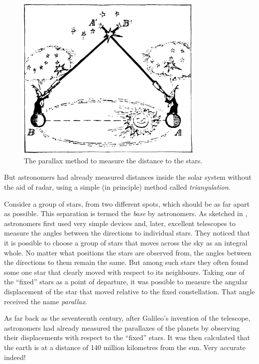 \begin{figure}[!ht]
\centering
\includegraphics[width=0.8\textwidth]{figures/fig-07-01.pdf}
\caption{The parallax method to measure the distance to the stars.}
\label{fig-7.1}
\end{figure}

But astronomers had already measured distances inside the solar system without the aid of radar, using a simple (in principle) method called \emph{triangulation}.


Consider a group of stars, from two different spots, which should be as far apart as possible. This separation is termed the \emph{base} by astronomers. As sketched in , astronomers first used very simple devices and, later, excellent telescopes to measure the angles between the directions to individual stars. They noticed that it is possible to choose a group of stars that moves across the sky as an integral whole. No matter what positions the stars are observed from, the angles between the directions to them remain the same. But among such stars they often found some one star that clearly moved with respect to its neighbours. Taking one of the ``fixed'' stars as a point of departure, it was possible to measure the angular displacement of the star that moved relative to the fixed constellation. That angle received the name \emph{parallax}.

As far back as the seventeenth century, after Galileo’s invention of the telescope, astronomers had already mea­sured the parallaxes of the planets by observing their displacements with respect to the ``fixed'' stars. It was then calculated that the earth is at a distance of 140 mil­lion kilometres from the sun. Very accurate indeed!

